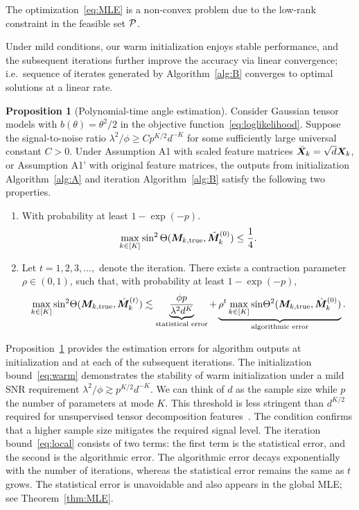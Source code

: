 \documentclass[12pt]{article}
\theoremstyle{definition}
\newtheorem{prop}{Proposition}[section]
\theoremstyle{definition}
\newcommand*{\KeepStyleUnderBrace}[1]{%
  \mathop{%
    \mathchoice
    {\underbrace{\displaystyle#1}}%
    {\underbrace{\textstyle#1}}%
    {\underbrace{\scriptstyle#1}}%
    {\underbrace{\scriptscriptstyle#1}}%
  }\limits
}
\begin{document}
The optimization~\eqref{eq:MLE} is a non-convex problem due to the low-rank constraint in the feasible set $\mathcal{P}$. {\color{blue}Under mild conditions, our warm initialization enjoys stable performance, and the subsequent iterations further improve the accuracy via linear convergence; i.e.\ sequence of iterates generated by Algorithm~\ref{alg:B} converges to optimal solutions at a linear rate. 

\begin{prop}[Polynomial-time angle estimation]\label{lem:ini} Consider Gaussian tensor models with $b(\theta)=\theta^2/2$ in the objective function~\eqref{eq:loglikelihood}. Suppose the signal-to-noise ratio $\lambda^2/\phi \geq C p^{K/2}d^{-K}$ for some sufficiently large universal constant $C>0$. 
Under Assumption A1 with scaled feature matrices $\bar {\bm X}_k=\sqrt{d}\bm X_k$, or Assumption A1' with original feature matrices, the outputs from initialization Algorithm~\ref{alg:A} and iteration Algorithm~\ref{alg:B} satisfy the following two properties.
\begin{enumerate}[label=(\alph*)]
\item With probability at least $1-\exp(-p)$. 
\begin{equation}\label{eq:warm}
\max_{k\in[K]}\sin^2\Theta(\bm M_{k,\textup{true}},\hat {\bm M}_k^{(0)})\leq {1\over 4}. 
\end{equation}
\item Let $t=1,2,3,\ldots,$ denote the iteration. There exists a contraction parameter $\rho\in(0,1)$, such that, with probability at least $1-\exp(-p)$, 
\begin{equation}\label{eq:local}
\max_{k\in[K]}\textup{sin}^2 \Theta(\trueM, \hat \mM^{(t)}_k) \lesssim \KeepStyleUnderBrace{{\phi p \over \lambda^2 d^K}}_{\text{statistical error}}+\KeepStyleUnderBrace{\rho^{t}\max_{k\in[K]}\textup{sin} \Theta^2(\trueM, \hat \mM_k^{(0)})}_{\text{algorithmic error}}.
\end{equation}
\end{enumerate}
\end{prop}

Proposition~\ref{lem:ini} provides the estimation errors for algorithm outputs at initialization and at each of the subsequent iterations. The initialization bound~\eqref{eq:warm} demonstrates the stability of warm initialization under a mild SNR requirement $\lambda^2/\phi \gtrsim p^{K/2}d^{-K}$. We can think of $d$ as the sample size while $p$ the number of parameters at mode $K$. This threshold is less stringent than $d^{K/2}$ required for unsupervised tensor decomposition features~\citep{han2020optimal,zhang2018tensor}. The condition confirms that a higher sample size mitigates the required signal level. The iteration bound~\eqref{eq:local} consists of two terms: the first term is the statistical error, and the second is the algorithmic error. The algorithmic error decays exponentially with the number of iterations, whereas the statistical error remains the same as $t$ grows. The statistical error is unavoidable and also appears in the global MLE; see Theorem~\ref{thm:MLE}.

}
\end{document}
